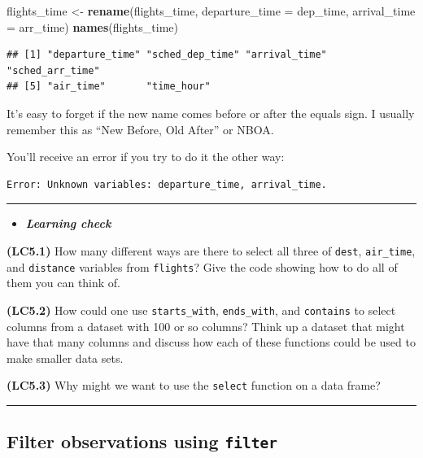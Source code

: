 \documentclass[]{tufte-book}
\newenvironment{Shaded}{\begin{snugshade}}{\end{snugshade}}
\newcommand{\KeywordTok}[1]{\textcolor[rgb]{0.13,0.29,0.53}{\textbf{{#1}}}}
\newcommand{\DataTypeTok}[1]{\textcolor[rgb]{0.13,0.29,0.53}{{#1}}}
\newcommand{\StringTok}[1]{\textcolor[rgb]{0.31,0.60,0.02}{{#1}}}
\newcommand{\NormalTok}[1]{{#1}}
\newenvironment{rmdblock}[1]
  {\begin{shaded*}
  \begin{itemize}
  \renewcommand{\labelitemi}{
    \raisebox{-.7\height}[0pt][0pt]{
    }
  }
  \item
  }
  {
  \end{itemize}
  \end{shaded*}
  }
\newenvironment{learncheck}
  {\begin{rmdblock}{warning}}
  {\end{rmdblock}}
\begin{document}
\begin{Shaded}
\begin{Highlighting}[]
\NormalTok{flights_time <-}\StringTok{ }\KeywordTok{rename}\NormalTok{(flights_time,}
                       \DataTypeTok{departure_time =} \NormalTok{dep_time,}
                       \DataTypeTok{arrival_time =} \NormalTok{arr_time)}
\KeywordTok{names}\NormalTok{(flights_time)}
\end{Highlighting}
\end{Shaded}

\begin{verbatim}
## [1] "departure_time" "sched_dep_time" "arrival_time"   "sched_arr_time"
## [5] "air_time"       "time_hour"
\end{verbatim}

It's easy to forget if the new name comes before or after the equals
sign. I usually remember this as ``New Before, Old After'' or NBOA.

You'll receive an error if you try to do it the other way:

\begin{verbatim}
Error: Unknown variables: departure_time, arrival_time.
\end{verbatim}

\begin{center}\rule{\linewidth}{\linethickness}\end{center}

\begin{learncheck}
\textbf{\emph{Learning check}}
\end{learncheck}

\textbf{(LC5.1)} How many different ways are there to select all three
of \texttt{dest}, \texttt{air\_time}, and \texttt{distance} variables
from \texttt{flights}? Give the code showing how to do all of them you
can think of.

\textbf{(LC5.2)} How could one use \texttt{starts\_with},
\texttt{ends\_with}, and \texttt{contains} to select columns from a
dataset with 100 or so columns? Think up a dataset that might have that
many columns and discuss how each of these functions could be used to
make smaller data sets.

\textbf{(LC5.3)} Why might we want to use the \texttt{select} function
on a data frame?

\begin{center}\rule{\linewidth}{\linethickness}\end{center}

\subsection{\texorpdfstring{Filter observations using
\texttt{filter}}{Filter observations using filter}}\label{filter-observations-using-filter}
\end{document}
